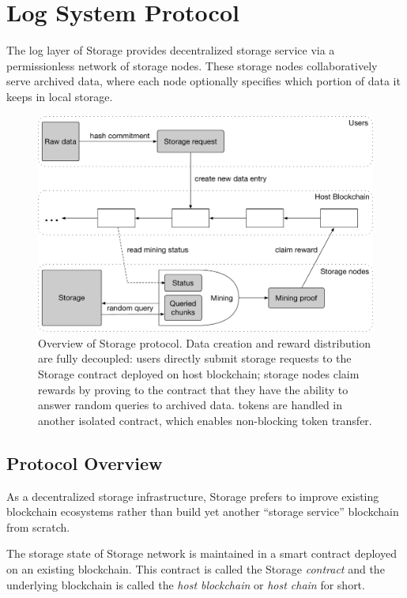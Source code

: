 \section{Log System Protocol}


The log layer of \projabbrev Storage provides decentralized storage service via a permissionless network of storage nodes.
These storage nodes collaboratively serve archived data,
where each node optionally specifies which portion of data it keeps in local storage.

\begin{figure}[H]
		\includegraphics[width=\textwidth]{figure/protocol_overview.pdf}
		\caption{Overview of \projabbrev Storage protocol. Data creation and reward distribution are fully decoupled: users directly submit storage requests to the \projabbrev Storage contract deployed on host blockchain; storage nodes claim rewards by proving to the contract that they have the ability to answer random queries to archived data. \projabbrev tokens are handled in another isolated contract, which enables non-blocking token transfer.}
		\label{fig:overview}
\end{figure}

\subsection{Protocol Overview}

As a decentralized storage infrastructure, \projabbrev Storage prefers to improve existing blockchain ecosystems rather than build yet another ``storage service'' blockchain from scratch.

The storage state of \projabbrev Storage network is maintained in a smart contract deployed on an existing blockchain.
This contract is called the \projabbrev Storage \emph{contract} and the underlying blockchain is called the \emph{host blockchain} or \emph{host chain} for short.

